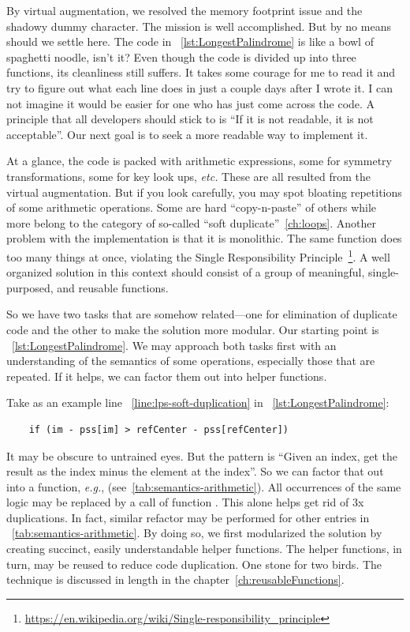 By virtual augmentation, we resolved the memory footprint issue and the shadowy dummy character.
The mission is well accomplished.
But by no means should we settle here.
The code in ~\autoref{lst:LongestPalindrome} is like a bowl of spaghetti noodle, isn't it?
Even though the code is divided up into three functions, its cleanliness still suffers.
It takes some courage for me to read it and try to figure out what each line does in just a couple
days after I wrote it.
I can not imagine it would be easier for one who has just come across the code.
A principle that all developers should stick to is
``If it is not readable, it is not acceptable''.
Our next goal is to seek a more readable way to implement it.


At a glance, the code is packed with arithmetic expressions, some for symmetry
transformations, some for key look ups, \textit{etc.}
These are all resulted from the virtual augmentation.
But if you look carefully, you may spot bloating repetitions of some arithmetic operations.
Some are hard ``copy-n-paste'' of others while
more belong to the category of so-called ``soft duplicate''~\autoref{ch:loops}.
Another problem with the implementation is that it is monolithic.
The same function does too many things at once, violating the Single Responsibility
Principle~\footnote{\url{https://en.wikipedia.org/wiki/Single-responsibility_principle}}.
A well organized solution in this context should consist of a group of meaningful, single-purposed,
and reusable functions.


So we have two tasks that are somehow related---one for elimination of duplicate code and the
other to make the solution more modular.
Our starting point is ~\autoref{lst:LongestPalindrome}.
We may approach both tasks first with an understanding of the semantics of some operations,
especially those that are repeated.
If it helps, we can factor them out into helper functions.


Take as an example line ~\autoref{line:lps-soft-duplication} in ~\autoref{lst:LongestPalindrome}:
\begin{lstlisting}
    if (im - pss[im] > refCenter - pss[refCenter])
\end{lstlisting}
It may be obscure to untrained eyes.
But the pattern is ``Given an index, get the result as the index minus the element
at the index''.
So we can factor that out into a function, \textit{e.g.}, 
(see~\autoref{tab:semantics-arithmetic}).
All occurrences of the same logic may be replaced by a call of function .
This alone helps get rid of $3$x duplications.
In fact, similar refactor may be performed for other entries in
~\autoref{tab:semantics-arithmetic}.
By doing so, we first modularized the solution by creating succinct, easily understandable helper
functions.
The helper functions, in turn, may be reused to reduce code duplication.
One stone for two birds.
The technique is discussed in length in the chapter~\autoref{ch:reusableFunctions}.


